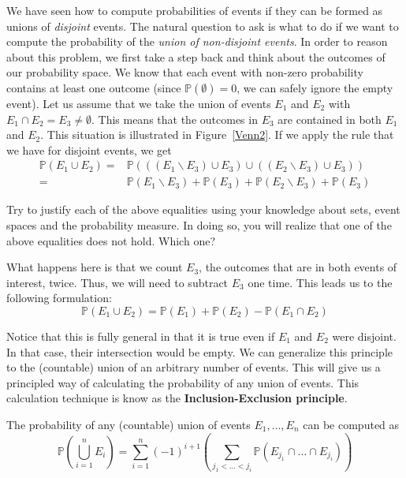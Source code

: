 We have seen how to compute probabilities of events if they can be formed as unions of \textit{disjoint}
events. The natural question to ask is what to do if we want to compute the probability of the \emph{union
of non-disjoint events}. In order to reason about this problem, we first take a step back and think about the
outcomes of our probability space. We know that each event with non-zero probability contains at least one outcome (since
$ \mathbb{P}(\emptyset) = 0 $, we can safely ignore the empty event). Let us assume that we take the union of events
$ E_{1} $ and $ E_{2} $ with $ E_{1} \cap E_{2} = E_{3} \not = \emptyset $. This means that the outcomes
in $ E_{3} $ are contained in both $ E_{1} $ and $ E_{2} $. This situation is illustrated in Figure~\ref{Venn2}. 
If we apply the rule that we have for disjoint events, we get 
\begin{align} \label{InExFalse}
\mathbb{P}(E_{1} \cup E_{2})
=& \mathbb{P}(((E_{1}\backslash E_{3}) \cup E_{3}) \cup ((E_{2}\backslash E_{3}) \cup E_{3})) \\
=& \mathbb{P}(E_{1}\backslash E_{3}) + \mathbb{P}(E_{3}) + \mathbb{P}(E_{2}\backslash E_{3}) \nonumber
+ \mathbb{P}(E_{3})
\end{align}

\begin{Exercise}
Try to justify each of the above equalities using your knowledge about sets, event spaces and the 
probability measure. In doing so, you will realize that one of the above equalities does not hold.
Which one? 
\end{Exercise}

What happens here is that we count $ E_{3} $, the outcomes that are in both events of interest, twice.
Thus, we will need to subtract $ E_{3} $ one time. This leads us to the following formulation:
\begin{equation}
\mathbb{P}(E_{1} \cup E_{2}) = \mathbb{P}(E_{1}) + \mathbb{P}(E_{2}) - \mathbb{P}(E_{1} \cap E_{2})
\end{equation}

Notice that this is fully general in that it is true even if $ E_{1} $ and $ E_{2} $ were disjoint. In that
case, their intersection would be empty. We can generalize this principle to the (countable) union of
an arbitrary number of events. This will give us a principled way of calculating the probability of any
union of events. This calculation technique is know as the \textbf{Inclusion-Exclusion principle}.

\begin{Theorem}
The probability of any (countable) union of events $ E_{1}, \ldots, E_{n} $ can be computed as
\begin{equation}\label{eq:incexc}
\mathbb{P} \left( \underset{i=1}{\overset{n}{\bigcup}} E_{i} \right) 
= \underset{i=1}{\overset{n}{\sum}} (-1)^{i+1} \left( \underset{j_{1}<\ldots<j_{i}}{\sum} 
\mathbb{P} \left(E_{j_{1}} \cap \ldots \cap E_{j_{i}} \right) \right)
\end{equation}
\end{Theorem}

